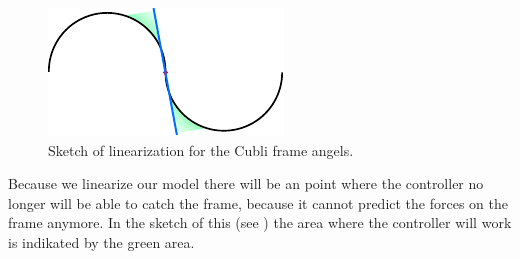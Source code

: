 \begin{figure}[H] 
	\centering 
	\includegraphics[scale=1.4]{figures/linearizationPoint}
	\caption{Sketch of linearization for the Cubli frame angels.}
	\label{LinearizationSketch}
\end{figure} 
Because we linearize our model there will be an point where the controller no longer will be able to catch the frame, because it cannot predict the forces on the frame anymore. In the sketch of this (see ) the area where the controller will work is indikated by the green area. 